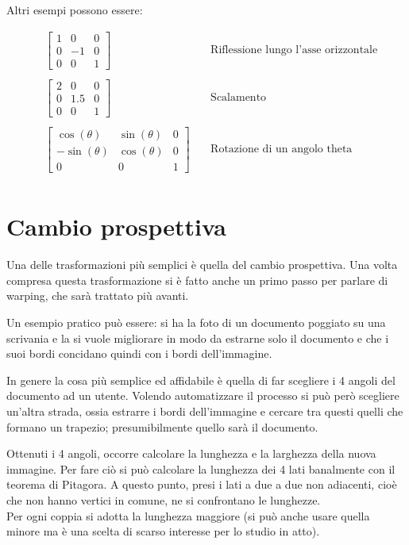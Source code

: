 \newpage \noindent 
Altri esempi possono essere:

\begin{align*}
&\begin{bmatrix}
1&0&0\\
0&-1&0\\
0&0&1
\end{bmatrix}&~&
\text{Riflessione lungo l'asse orizzontale}\\
\\
&\begin{bmatrix}
2&0&0\\
0&1.5&0\\
0&0&1
\end{bmatrix}&~&
\text{Scalamento}\\
\\
&\begin{bmatrix}
\cos(\theta )&\sin(\theta )&0\\
-\sin(\theta )&\cos(\theta )&0\\
0&0&1
\end{bmatrix}&~&
\text{Rotazione di un angolo theta}\\
\end{align*}



\section{Cambio prospettiva}
Una delle trasformazioni più semplici è quella del cambio prospettiva. Una volta compresa questa trasformazione si è fatto anche un primo passo per parlare di warping, che sarà trattato più avanti.

\vspace{1em} \noindent
Un esempio pratico può essere: si ha la foto di un documento poggiato su una scrivania e la si vuole migliorare in modo da estrarne solo il documento e che i suoi bordi concidano quindi con i bordi dell'immagine.

\vspace{1em} \noindent
In genere la cosa più semplice ed affidabile è quella di far scegliere i 4 angoli del documento ad un utente. Volendo automatizzare il processo si può però scegliere un'altra strada, ossia estrarre i bordi dell'immagine e cercare tra questi quelli che formano un trapezio; presumibilmente quello sarà il documento.

\vspace{1em} \noindent
Ottenuti i 4 angoli, occorre calcolare la lunghezza e la larghezza della nuova immagine. Per fare ciò si può calcolare la lunghezza dei 4 lati banalmente con il teorema di Pitagora. A questo punto, presi i lati a due a due non adiacenti, cioè che non hanno vertici in comune, ne si confrontano le lunghezze.\\
Per ogni coppia si adotta la lunghezza maggiore (si può anche usare quella minore ma è una scelta di scarso interesse per lo studio in atto).

